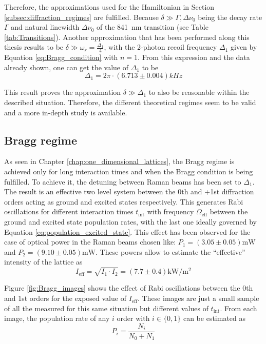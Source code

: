 Therefore, the approximations used for the Hamiltonian in Section \ref{subsec:diffraction_regimes} are fulfilled. Because $\delta \gg \Gamma, \Delta\nu_0$ being the decay rate $\Gamma$ and natural linewidth $\Delta\nu_0$ of the \SI{841}{\nano\meter} transition (see Table \ref{tab:Transitions}). Another approximation that has been performed along this thesis results to be $\delta \gg \omega_r = \frac{\Delta_1}{4}$, with the 2-photon recoil frequency $\Delta_1$ given by Equation \eqref{eq:Bragg_condition} with $n=1$. From this expression and the data already shown, one can get the value of $\Delta_1$ to be
\begin{equation*}
	\Delta_1 = 2\pi \cdot (6.713 \pm 0.004)\si{kHz}
\end{equation*}

This result proves the approximation $\delta \gg \Delta_1$ to also be reasonable within the described situation. Therefore, the different theoretical regimes seem to be valid and a more in-depth study is available.

\subsection{Bragg regime}

As seen in Chapter \ref{chap:one_dimensional_lattices}, the Bragg regime is achieved only for long interaction times and when the Bragg condition is being fulfilled. To achieve it, the detuning between Raman beams has been set to $\Delta_1$. The result is an effective two level system between the 0th and +1st diffraction orders acting as ground and excited states respectively. This generates Rabi oscillations for different interaction times $t_\text{int}$ with frequency $\Omega_\text{eff}$ between the ground and excited state population rates, with the last one ideally governed by Equation \ref{eq:population_excited_state}. This effect has been observed for the case of optical power in the Raman beams chosen like: $P_1 = (3.05 \pm 0.05)\si{\milli\watt}$ and $P_2 = (9.10 \pm 0.05)\si{\milli\watt}$. These powers allow to estimate the ``effective'' intensity of the lattice as
\begin{equation*}
	I_\text{eff} = \sqrt{I_1\cdot I_2} = (7.7 \pm 0.4)\si{\kilo\watt\per\meter\squared}
\end{equation*} 

Figure \ref{fig:Bragg_images} shows the effect of Rabi oscillations between the 0th and 1st orders for the exposed value of $I_\text{eff}$. These images are just a small sample of all the measured for this same situation but different values of $t_\text{int}$. From each image, the population rate of any $i$ order with $i \in \{0,1\}$ can be estimated as
\begin{equation}
	P_i = \frac{N_i}{N_0+N_1}
\end{equation}

